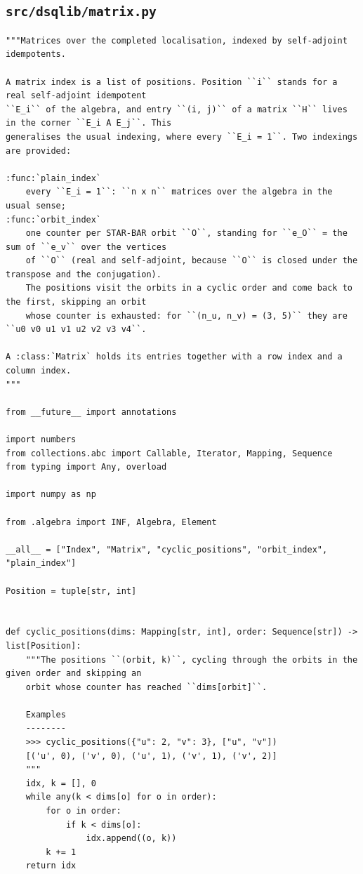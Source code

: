 \documentclass[12pt, a4paper]{report}
\theoremstyle{plain}
\theoremstyle{definition}
\theoremstyle{remark}
\theoremstyle{plain}
\begin{document}
\subsection{\texorpdfstring{\texttt{src/dsqlib/matrix.py}}{src/dsqlib/matrix.py}}
\begin{lstlisting}[style=dsqcode]
"""Matrices over the completed localisation, indexed by self-adjoint idempotents.

A matrix index is a list of positions. Position ``i`` stands for a real self-adjoint idempotent
``E_i`` of the algebra, and entry ``(i, j)`` of a matrix ``H`` lives in the corner ``E_i A E_j``. This
generalises the usual indexing, where every ``E_i = 1``. Two indexings are provided:

:func:`plain_index`
    every ``E_i = 1``: ``n x n`` matrices over the algebra in the usual sense;
:func:`orbit_index`
    one counter per STAR-BAR orbit ``O``, standing for ``e_O`` = the sum of ``e_v`` over the vertices
    of ``O`` (real and self-adjoint, because ``O`` is closed under the transpose and the conjugation).
    The positions visit the orbits in a cyclic order and come back to the first, skipping an orbit
    whose counter is exhausted: for ``(n_u, n_v) = (3, 5)`` they are ``u0 v0 u1 v1 u2 v2 v3 v4``.

A :class:`Matrix` holds its entries together with a row index and a column index.
"""

from __future__ import annotations

import numbers
from collections.abc import Callable, Iterator, Mapping, Sequence
from typing import Any, overload

import numpy as np

from .algebra import INF, Algebra, Element

__all__ = ["Index", "Matrix", "cyclic_positions", "orbit_index", "plain_index"]

Position = tuple[str, int]


def cyclic_positions(dims: Mapping[str, int], order: Sequence[str]) -> list[Position]:
    """The positions ``(orbit, k)``, cycling through the orbits in the given order and skipping an
    orbit whose counter has reached ``dims[orbit]``.

    Examples
    --------
    >>> cyclic_positions({"u": 2, "v": 3}, ["u", "v"])
    [('u', 0), ('v', 0), ('u', 1), ('v', 1), ('v', 2)]
    """
    idx, k = [], 0
    while any(k < dims[o] for o in order):
        for o in order:
            if k < dims[o]:
                idx.append((o, k))
        k += 1
    return idx



\end{lstlisting}
\end{document}
